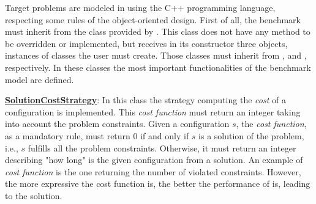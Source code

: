 
Target problems are modeled in \posl{} using the C++ programming language, respecting some rules of the object-oriented design. First of all, the benchmark must inherit from the  class provided by \posl. This class does not have any method to be overridden or implemented, but receives in its constructor three objects, instances of classes the user must create. Those classes must inherit from ,  and , respectively. In these classes the most important functionalities of the benchmark model are defined.

\underline{\textbf{SolutionCostStrategy}}: In this class the strategy computing the \textit{cost} of a configuration is implemented. This \textit{cost function} must return an integer taking into account the problem constraints. Given a configuration $s$, the \textit{cost function}, as a mandatory rule, must return 0 if and only if $s$ is a solution of the problem, i.e., $s$ fulfills all the problem constraints. Otherwise, it must return an integer describing "how long" is the given configuration from a solution. An example of \textit{cost function} is the one returning the number of violated constraints. However, the more expressive the cost function is, the better the performance of \posl{} is, leading to the solution.


